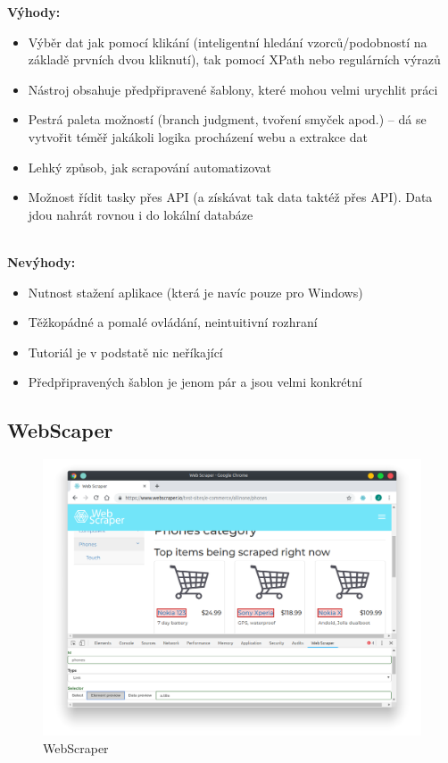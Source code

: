 \documentclass[thesis=B,czech]{FITthesis}[2012/06/26]
\begin{document}
\textbf{Výhody:}
\begin{itemize}
	\item Výběr dat jak pomocí klikání (inteligentní hledání vzorců/podobností na základě prvních dvou kliknutí), tak pomocí XPath nebo regulárních výrazů
	\item Nástroj obsahuje předpřipravené šablony, které mohou velmi urychlit práci
	\item Pestrá paleta možností (branch judgment, tvoření smyček apod.) -- dá se vytvořit téměř jakákoli logika procházení webu a extrakce dat
	\item Lehký způsob, jak scrapování automatizovat
	\item Možnost řídit tasky přes API (a získávat tak data taktéž přes API). Data jdou nahrát rovnou i do lokální databáze\\\\
\end{itemize}

\textbf{Nevýhody:}
\begin{itemize}
	\item Nutnost stažení aplikace (která je navíc pouze pro Windows)
	\item Těžkopádné a pomalé ovládání, neintuitivní rozhraní
	\item Tutoriál je v podstatě nic neříkající
	\item Předpřipravených šablon je jenom pár a jsou velmi konkrétní
\end{itemize}


\newpage
\subsection{WebScaper}
\begin{figure}[h]
	\includegraphics[width=\linewidth]{images/WebScraper.png}
	\caption{WebScraper}
	\label{fig:webScraper}
\end{figure}
\end{document}
